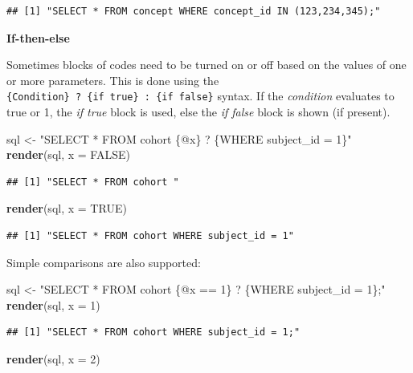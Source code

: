 \documentclass[11pt]{book}
\newenvironment{Shaded}{\begin{snugshade}}{\end{snugshade}}
\newcommand{\DataTypeTok}[1]{\textcolor[rgb]{0.13,0.29,0.53}{#1}}
\newcommand{\DecValTok}[1]{\textcolor[rgb]{0.00,0.00,0.81}{#1}}
\newcommand{\KeywordTok}[1]{\textcolor[rgb]{0.13,0.29,0.53}{\textbf{#1}}}
\newcommand{\NormalTok}[1]{#1}
\newcommand{\OtherTok}[1]{\textcolor[rgb]{0.56,0.35,0.01}{#1}}
\newcommand{\StringTok}[1]{\textcolor[rgb]{0.31,0.60,0.02}{#1}}
\theoremstyle{definition}
\theoremstyle{definition}
\theoremstyle{definition}
\theoremstyle{remark}
\begin{document}
\begin{verbatim}
## [1] "SELECT * FROM concept WHERE concept_id IN (123,234,345);"
\end{verbatim}

\textbf{If-then-else}

Sometimes blocks of codes need to be turned on or off based on the values of one or more parameters. This is done using the \texttt{\{Condition\}\ ?\ \{if\ true\}\ :\ \{if\ false\}} syntax. If the \emph{condition} evaluates to true or 1, the \emph{if true} block is used, else the \emph{if false} block is shown (if present).

\begin{Shaded}
\begin{Highlighting}[]
\NormalTok{sql <-}\StringTok{ "SELECT * FROM cohort \{@x\} ? \{WHERE subject_id = 1\}"}
\KeywordTok{render}\NormalTok{(sql, }\DataTypeTok{x =} \OtherTok{FALSE}\NormalTok{)}
\end{Highlighting}
\end{Shaded}

\begin{verbatim}
## [1] "SELECT * FROM cohort "
\end{verbatim}

\begin{Shaded}
\begin{Highlighting}[]
\KeywordTok{render}\NormalTok{(sql, }\DataTypeTok{x =} \OtherTok{TRUE}\NormalTok{)}
\end{Highlighting}
\end{Shaded}

\begin{verbatim}
## [1] "SELECT * FROM cohort WHERE subject_id = 1"
\end{verbatim}

Simple comparisons are also supported:

\begin{Shaded}
\begin{Highlighting}[]
\NormalTok{sql <-}\StringTok{ "SELECT * FROM cohort \{@x == 1\} ? \{WHERE subject_id = 1\};"}
\KeywordTok{render}\NormalTok{(sql, }\DataTypeTok{x =} \DecValTok{1}\NormalTok{)}
\end{Highlighting}
\end{Shaded}

\begin{verbatim}
## [1] "SELECT * FROM cohort WHERE subject_id = 1;"
\end{verbatim}

\begin{Shaded}
\begin{Highlighting}[]
\KeywordTok{render}\NormalTok{(sql, }\DataTypeTok{x =} \DecValTok{2}\NormalTok{)}
\end{Highlighting}
\end{Shaded}
\end{document}
